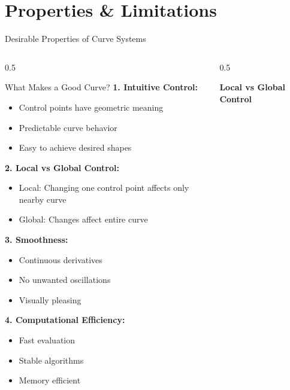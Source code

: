 \section{Properties \& Limitations}

\begin{frame}{Desirable Properties of Curve Systems}
  \begin{columns}
    \begin{column}{0.5\textwidth}
      \begin{conceptbox}{What Makes a Good Curve?}
        \footnotesize
        \textbf{1. Intuitive Control:}
        \begin{itemize}
          \item Control points have geometric meaning
          \item Predictable curve behavior
          \item Easy to achieve desired shapes
        \end{itemize}

        \textbf{2. Local vs Global Control:}
        \begin{itemize}
          \item \textcolor{SecondaryColor}{Local}: Changing one control point affects only nearby curve
          \item \textcolor{AccentColor}{Global}: Changes affect entire curve
        \end{itemize}

        \textbf{3. Smoothness:}
        \begin{itemize}
          \item Continuous derivatives
          \item No unwanted oscillations
          \item Visually pleasing
        \end{itemize}

        \textbf{4. Computational Efficiency:}
        \begin{itemize}
          \item Fast evaluation
          \item Stable algorithms
          \item Memory efficient
        \end{itemize}
      \end{conceptbox}
    \end{column}
    \begin{column}{0.5\textwidth}
      \begin{center}
        \textbf{Local vs Global Control}


\end{center}
\end{column}
\end{columns}
\end{frame}

